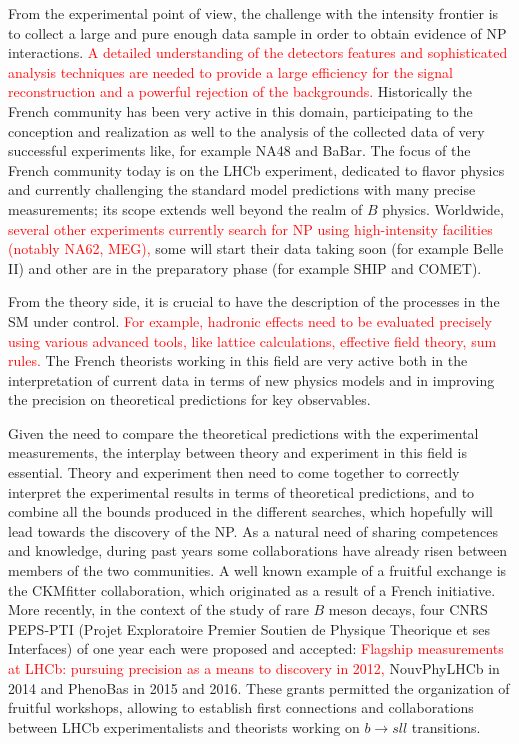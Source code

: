 From the experimental point of view, the challenge with the intensity frontier is to collect a large and pure enough data sample in order to obtain evidence of NP interactions. \textcolor{red}{A detailed understanding of the detectors features and sophisticated analysis techniques are needed to provide a large efficiency for the signal reconstruction and a powerful rejection of the backgrounds.}  Historically the French community has been very active in this domain, participating to the conception and realization as well to the analysis of the collected data of very successful experiments like, for example NA48 and BaBar.  The focus of the French community today is on the  LHCb experiment, dedicated to flavor physics and currently challenging the standard model predictions with many precise measurements; its scope extends well beyond the realm of $B$ physics. Worldwide, \textcolor{red}{several other experiments currently search for NP using high-intensity facilities (notably NA62, MEG),}  some will start their data taking soon (for example Belle II) and other are in the preparatory phase (for example SHIP and COMET). 

From the theory side, it is crucial to have the description of the processes in the SM under control. \textcolor{red}{For example, hadronic effects need to be evaluated precisely using various advanced tools, like lattice calculations, effective field theory, sum rules. } 
The French theorists working in this field are very active both in the interpretation of current data in terms of new physics models and in improving the precision on theoretical  predictions for key observables. 

Given the need to compare the theoretical predictions with the experimental measurements, the interplay between theory and experiment in this field is essential. Theory and experiment then need to come together to correctly interpret the experimental results in terms of theoretical predictions, and to combine all the bounds produced in the different searches, which hopefully  will lead towards the discovery of the NP. 
 As a natural need of sharing competences and knowledge, during past years some collaborations have already risen between members of the two communities. A well known example of a fruitful exchange is the CKMfitter collaboration, which originated as a result of a French initiative. More recently, in the context of the study of rare $B$ meson decays, four  CNRS PEPS-PTI (Projet Exploratoire Premier Soutien de Physique Theorique et ses Interfaces) of one year each were proposed and accepted: \textcolor{red}{ Flagship measurements at LHCb: pursuing precision as a means to discovery in 2012,} NouvPhyLHCb in 2014 and PhenoBas in 2015 and 2016. These grants permitted the organization of  fruitful workshops,  allowing to establish first connections and collaborations between LHCb experimentalists and theorists  working on $b \to sll$ transitions. 

